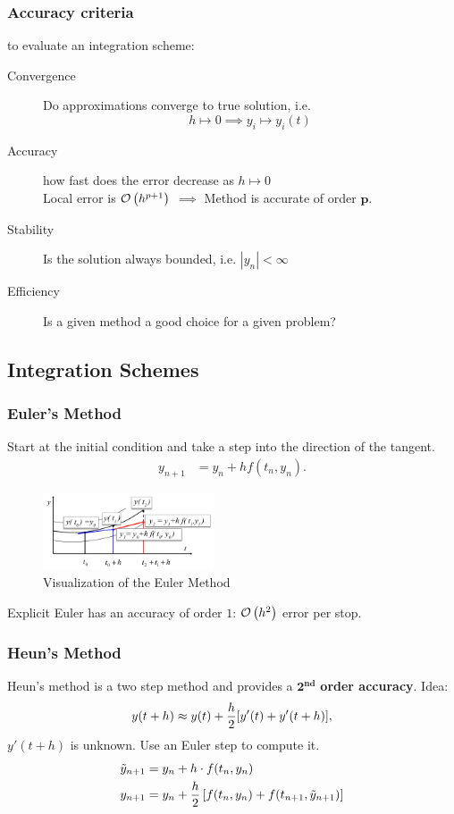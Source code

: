 \begin{multicols}{2}
\subsubsection{Accuracy criteria} to evaluate an integration scheme:
\begin{description}
	\item[Convergence] Do approximations converge to true solution, i.e. 
		\[
			h\mapsto 0 \implies y_i \mapsto y_i(t)
		\]
	\item[Accuracy] how fast does the error decrease as $h\mapsto 0$\\
		Local error is $\mathcal O\left(h^{p+1}\right)$ $\implies$ Method is accurate of order $\mathbf p$.
	\item[Stability] Is the solution always bounded, i.e. $|y_n| < \infty$
	\item[Efficiency] Is a given method a good choice for a given problem?
\end{description}

\subsection{Integration Schemes}

\subsubsection{Euler's Method} Start at the initial condition and take a step into the direction of the tangent.
\begin{align*}
	y_{n+1} &= y_n + hf(t_n, y_n).
\end{align*}

\begin{figure}[H]
	\centering
	\includegraphics[width=0.45\textwidth]{img/01_euler}
	\caption{Visualization of the Euler Method}
\end{figure}

Explicit Euler has an accuracy of order $1$: $\mathcal O\left(h^2\right)$ error per stop.


\subsubsection{Heun's Method}
Heun's method is a two step method and provides a $\mathbf{2^{nd}}$ \textbf{order accuracy}. Idea:
\[
	y(t+h) \approx y(t) + {h \over 2} [y'(t) + y'(t+h)],
\]
$y'(t+h)$ is unknown. Use an Euler step to compute it. 
\begin{align*}
	\tilde y_{n+1} &= y_n + h\cdot f(t_n, y_n) \\
	y_{n+1} &= y_n + {h \over 2} \left[ f(t_n, y_n) + f(t_{n+1}, \tilde y_{n+1}) \right]
\end{align*}


\end{multicols}
